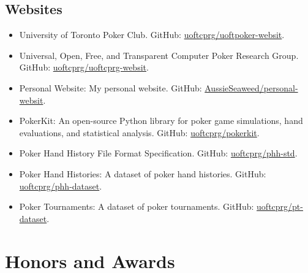 \documentclass{article}
\begin{document}
{		\subsection*{Websites}

		\begin{itemize}[noitemsep]
			\item University of Toronto Poker Club. GitHub: \href{https://github.com/uoftcprg/uoftpoker-website}{uoftcprg/uoftpoker-websit}.
			\item Universal, Open, Free, and Transparent Computer Poker Research Group. GitHub: \href{https://github.com/uoftcprg/uoftcprg-website}{uoftcprg/uoftcprg-websit}.
			\item Personal Website: My personal website. GitHub: \href{https://github.com/AussieSeaweed/personal-website}{AussieSeaweed/personal-websit}.
		\end{itemize}
	}{
		\begin{itemize}[noitemsep]
			\item PokerKit: An open-source Python library for poker game simulations, hand evaluations, and statistical analysis. GitHub: \href{https://github.com/uoftcprg/pokerkit}{uoftcprg/pokerkit}.
			\item Poker Hand History File Format Specification. GitHub: \href{https://github.com/uoftcprg/phh-std}{uoftcprg/phh-std}.
			\item Poker Hand Histories: A dataset of poker hand histories. GitHub: \href{https://github.com/uoftcprg/phh-dataset}{uoftcprg/phh-dataset}.
			\item Poker Tournaments: A dataset of poker tournaments. GitHub: \href{https://github.com/uoftcprg/pt-dataset}{uoftcprg/pt-dataset}.
		\end{itemize}
	}

	\section*{Honors and Awards}
\end{document}
